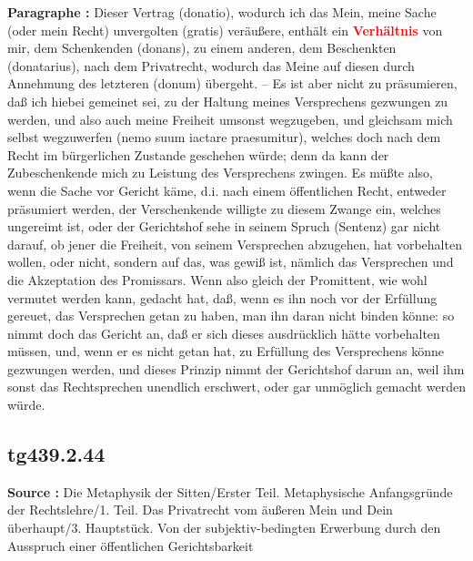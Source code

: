 \documentclass[a4paper,12pt,twoside]{book}
\newcommand{\match}[1]{\textcolor{red}{\textbf{#1}}}
\begin{document}
	\textbf{Paragraphe : }Dieser Vertrag (donatio), wodurch ich das Mein, meine Sache (oder mein Recht) unvergolten (gratis) veräußere, enthält ein \match{Verhältnis} von mir, dem Schenkenden (donans), zu einem anderen, dem Beschenkten (donatarius), nach dem Privatrecht, wodurch das Meine auf diesen durch Annehmung des letzteren (donum) übergeht. – Es ist aber nicht zu präsumieren, daß ich hiebei gemeinet sei, zu der Haltung meines Versprechens gezwungen zu werden, und also auch meine Freiheit umsonst wegzugeben, und gleichsam mich selbst wegzuwerfen (nemo suum iactare praesumitur), welches doch nach dem Recht im bürgerlichen Zustande geschehen würde; denn da kann der Zubeschenkende mich zu Leistung des Versprechens zwingen. Es müßte also, wenn die Sache vor Gericht käme, d.i. nach einem öffentlichen Recht, entweder präsumiert werden, der  Verschenkende willigte zu diesem Zwange ein, welches ungereimt ist, oder der Gerichtshof sehe in seinem Spruch (Sentenz) gar nicht darauf, ob jener die Freiheit, von seinem Versprechen abzugehen, hat vorbehalten wollen, oder nicht, sondern auf das, was gewiß ist, nämlich das Versprechen und die Akzeptation des Promissars. Wenn also gleich der Promittent, wie wohl vermutet werden kann, gedacht hat, daß, wenn es ihn noch vor der Erfüllung gereuet, das Versprechen getan zu haben, man ihn daran nicht binden könne: so nimmt doch das Gericht an, daß er sich dieses ausdrücklich hätte vorbehalten müssen, und, wenn er es nicht getan hat, zu Erfüllung des Versprechens könne gezwungen werden, und dieses Prinzip nimmt der Gerichtshof darum an, weil ihm sonst das Rechtsprechen unendlich erschwert, oder gar unmöglich gemacht werden würde. 
	
	\subsection*{tg439.2.44} 
	\textbf{Source : }Die Metaphysik der Sitten/Erster Teil. Metaphysische Anfangsgründe der Rechtslehre/1. Teil. Das Privatrecht vom äußeren Mein und Dein überhaupt/3. Hauptstück. Von der subjektiv-bedingten Erwerbung durch den Ausspruch einer öffentlichen Gerichtsbarkeit\\  
	
\end{document}
